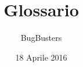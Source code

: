 
%



\usepackage{tracklang}
\usepackage[toc,nonumberlist,nopostdot]{glossaries}

\title{\textbf{Glossario}}
\author{BugBusters}

\date{18 Aprile 2016}

\makeglossaries






\makeFrontPage



\glsaddall %
\printglossary[title=Glossario,toctitle=Glossario dei termini,style=indexgroup,style=altlistgroup]


